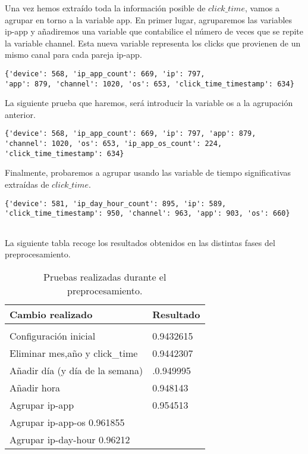 Una vez hemos extraído toda la información posible de $click\_time$, vamos a agrupar en torno a la variable app.
\medskip
En primer lugar, agruparemos las variables ip-app y añadiremos una variable que contabilice el número de veces que se repite la variable channel. Esta nueva variable representa los clicks que provienen de un mismo canal para cada pareja ip-app.
\begin{verbatim}
{'device': 568, 'ip_app_count': 669, 'ip': 797, 
'app': 879, 'channel': 1020, 'os': 653, 'click_time_timestamp': 634}

\end{verbatim}
La siguiente prueba que haremos, será introducir la variable os a la agrupación anterior.
\begin{verbatim}
{'device': 568, 'ip_app_count': 669, 'ip': 797, 'app': 879, 
'channel': 1020, 'os': 653, 'ip_app_os_count': 224, 'click_time_timestamp': 634}
\end{verbatim}
Finalmente, probaremos a agrupar usando las variable de tiempo significativas extraídas de $click\_time$.
\begin{verbatim}
{'device': 581, 'ip_day_hour_count': 895, 'ip': 589, 
'click_time_timestamp': 950, 'channel': 963, 'app': 903, 'os': 660}


\end{verbatim}
\medskip
La siguiente tabla recoge los resultados obtenidos en las distintas fases del preprocesamiento.
\begin{table}[H]
	\centering
	
	\begin{tabular}{ll}
		\textbf{Cambio realizado}& \textbf{Resultado} \\
		\hline
		\\
		Configuración inicial& 0.9432615     \\
		Eliminar mes,año y click\_time& 0.9442307   \\
		Añadir día (y día de la semana)& .0.949995  \\
		Añadir hora &  0.948143\\
		Agrupar ip-app &  0.954513\\
		Agrupar ip-app-os  0.961855& \\
		Agrupar ip-day-hour 0.96212 &\\
	\end{tabular}
\caption{Pruebas realizadas durante el preprocesamiento.}
\end{table}